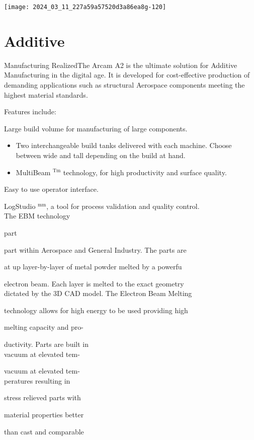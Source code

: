 \documentclass[10pt]{article}
\begin{document}
\begin{center}
\texttt{[image: 2024\_03\_11\_227a59a57520d3a86ea8g-120]}
\end{center}

\section*{Additive}
 Manufacturing RealizedThe Arcam A2 is the ultimate solution for Additive Manufacturing in the digital age. It is developed for cost-effective production of demanding applications such as structural Aerospace components meeting the highest material standards.

Features include:

Large build volume for manufacturing of large components.

\begin{itemize}
  \item Two interchangeable build tanks delivered with each machine. Choose between wide and tall depending on the build at hand.
  \item MultiBeam ${ }^{\mathrm{Tm}}$ technology, for high productivity and surface quality.
\end{itemize}

Easy to use operator interface.

LogStudio ${ }^{\mathrm{mm}}$, a tool for process validation and quality control.\\
The EBM technology

part

part within Aerospace and General Industry. The parts are

at up layer-by-layer of metal powder melted by a powerfu

electron beam. Each layer is melted to the exact geometry\\
dictated by the 3D CAD model. The Electron Beam Melting

technology allows for high energy to be used providing high

melting capacity and pro-

ductivity. Parts are built in\\
vacuum at elevated tem-

vacuum at elevated tem-\\
peratures resulting in

stress relieved parts with

material properties better

than cast and comparable
\end{document}
